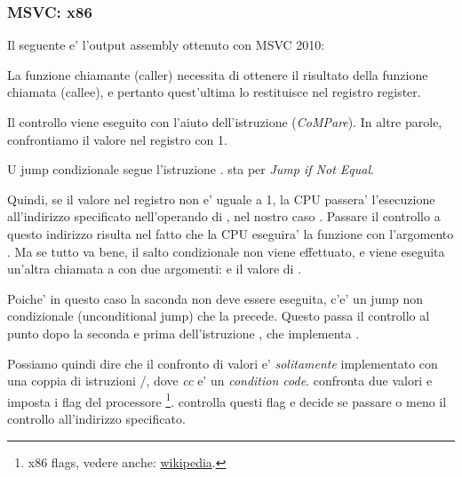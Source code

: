 \subsubsection{MSVC: x86}

Il seguente e' l'output assembly ottenuto con MSVC 2010:



La funzione chiamante (\gls{caller}) \main necessita di ottenere il risultato della funzione chiamata (\gls{callee}), 
e pertanto quest'ultima lo restituisce nel registro \EAX register.

Il controllo viene eseguito con l'aiuto dell'istruzione  (\emph{CoMPare}). In altre parole, confrontiamo il valore nel registro \EAX con 1.

U jump condizionale \JNE segue l'istruzione \CMP. \JNE sta per \emph{Jump if Not Equal}.

Quindi, se il valore nel registro \EAX non e' uguale a 1, la \ac{CPU} passera' l'esecuzione all'indirizzo specificato nell'operando di \JNE, nel nostro caso .
Passare il controllo a questo indirizzo risulta nel fatto che la \ac{CPU} eseguira' la funzione \printf con l'argomento .
Ma se tutto va bene, il salto condizionale non viene effettuato, e viene eseguita un'altra chiamata a \printf con due argomenti:  e il valore di .

Poiche' in questo caso la saconda \printf non deve essere eseguita, c'e' un jump non condizionale (unconditional jump) \JMP che la precede. 
Questo passa il controllo al punto dopo la seconda \printf e prima dell'istruzione , che implementa .

Possiamo quindi dire che il confronto di valori e' \emph{solitamente} implementato con una coppia di istruzioni \CMP/\Jcc, dove \emph{cc} e' un \emph{condition code}.
\CMP confronta due valori e imposta i flag del processore \footnote{x86 flags, vedere anche: \href{http://go.yurichev.com/17120}{wikipedia}.}.
\Jcc controlla questi flag e decide se passare o meno il controllo all'indirizzo specificato.

